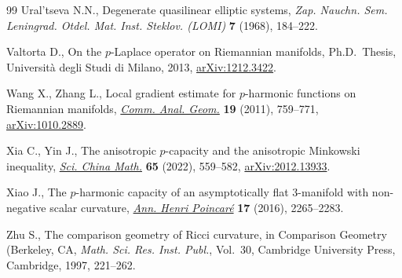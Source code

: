 \begin{thebibliography}{99}
Ural'tseva N.N., Degenerate quasilinear elliptic systems, \textit{Zap. Nauchn.
 Sem. Leningrad. Otdel. Mat. Inst. Steklov. (LOMI)} \textbf{7} (1968),
 184--222.

Valtorta D., On the $p$-{L}aplace operator on {R}iemannian manifolds, Ph.D.~Thesis, {U}niversit\`a degli Studi di Milano, 2013, \href{https://arxiv.org/abs/1212.3422}{arXiv:1212.3422}.

Wang X., Zhang L., Local gradient estimate for {$p$}-harmonic functions on
 {R}iemannian manifolds, \href{https://doi.org/10.4310/CAG.2011.v19.n4.a4}{\textit{Comm. Anal. Geom.}} \textbf{19} (2011),
 759--771, \href{https://arxiv.org/abs/1010.2889}{arXiv:1010.2889}.

Xia C., Yin J., The anisotropic {$p$}-capacity and the anisotropic {M}inkowski
 inequality, \href{https://doi.org/10.1007/s11425-021-1884-1}{\textit{Sci. China Math.}} \textbf{65} (2022), 559--582,
 \href{https://arxiv.org/abs/2012.13933}{arXiv:2012.13933}.

Xiao J., The {$p$}-harmonic capacity of an asymptotically flat 3-manifold with
 non-negative scalar curvature, \href{https://doi.org/10.1007/s00023-016-0475-8}{\textit{Ann. Henri Poincar\'e}} \textbf{17}
 (2016), 2265--2283.

Zhu S., The comparison geometry of {R}icci curvature, in Comparison {G}eometry
 ({B}erkeley, {CA}, \textit{Math. Sci. Res. Inst. Publ.}, Vol.~30, Cambridge
 University Press, Cambridge, 1997, 221--262.

\end{thebibliography}
